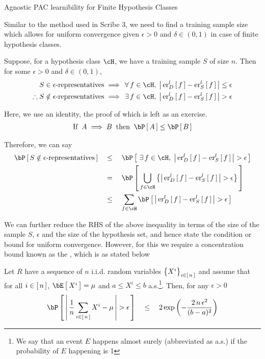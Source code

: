 \documentclass[11pt,a4paper]{article}
\begin{document}
\begin{ssection}[4]{Agnostic PAC learnibility for Finite Hypothesis Classes}

	Similar to the method used in Scribe 3, we need to find a training sample size which allows for uniform convergence given $\epsilon > 0$ and $\delta \in (0, 1)$ in case of finite hypothesis classes.

	Suppose, for a hypothesis class $\cH$, we have a training sample $S$ of size $n$. Then for some $\epsilon > 0$ and $\delta \in (0, 1)$,
	\begin{align*}
		S \in \epsilon\text{-representatives}					&\implies	\qforall f \in \cH,\; \abs{\err[_D^l]{f} - \err[_S^l]{f}} \le \epsilon \\
		\therefore S \notin \epsilon\text{-representatives}		&\implies	\qexists f \in \cH,\; \abs{\err[_D^l]{f} - \err[_S^l]{f}} > \epsilon
	\end{align*}

	Here, we use an identity, the proof of which is left as an exercise.
	\begin{align*}
		\mt{If} \: A \implies B \: \qmt{then} \: \prob{A} \le \prob{B}
	\end{align*} \sbr

	Therefore, we can say
	\begin{align*}
		\prob{S \notin \epsilon\text{-representatives}}	&\qle	\prob{\qexists f \in \cH,\; \abs{\err[_D^l]{f} - \err[_S^l]{f}} > \epsilon} \\
														&\eq	\prob{\bigcup_{f \in \cH} \set{\abs{\err[_D^l]{f} - \err[_S^l]{f}} > \epsilon}} \\
														&\qle	\sum_{f \in \cH} \prob{\abs{\err[_D^l]{f} - \err[_S^l]{f}} > \epsilon}
	\end{align*} \sbr

	We can further reduce the RHS of the above inequality in terms of the size of the sample $S$, $\epsilon$ and the size of the hypothesis set, and hence state the condition or bound for uniform convergence. However, for this we require a concentration bound known as the , which is as stated below

	\begin{theorem}
		Let $R$ have a sequence of $n$ i.i.d. random variables $\left\{ {X^i} \right\}_{i \in \left[\,{n}\,\right]}$ and assume that for all $i \in \left[\,{n}\,\right]$, $\E{X^i} = \mu$ and $a \le X^i \le b$ a.s.\footnote{We say that an event $E$ happens almost surely (abbreviated as a.s.) if the probability of $E$ happening is 1}. Then, for any $\epsilon > 0$
		\begin{equation}
			\prob{\abs{\frac{1}{n} \sum_{i \in \brac{n}} X^i - \mu} > \epsilon}	\qle	2 \texp{-\frac{2\,n\,\epsilon^2}{(b - a)^2}}
		\end{equation}
	\end{theorem}


\end{ssection}
\end{document}
